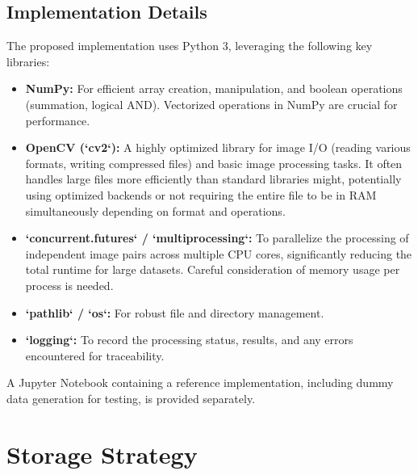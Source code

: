 \documentclass{article}
\begin{document}
\subsection{Implementation Details}
The proposed implementation uses Python 3, leveraging the following key libraries:
\begin{itemize}
    \item \textbf{NumPy:} For efficient array creation, manipulation, and boolean operations (summation, logical AND). Vectorized operations in NumPy are crucial for performance.
    \item \textbf{OpenCV (`cv2`):} A highly optimized library for image I/O (reading various formats, writing compressed files) and basic image processing tasks. It often handles large files more efficiently than standard libraries might, potentially using optimized backends or not requiring the entire file to be in RAM simultaneously depending on format and operations.
    \item \textbf{`concurrent.futures` / `multiprocessing`:} To parallelize the processing of independent image pairs across multiple CPU cores, significantly reducing the total runtime for large datasets. Careful consideration of memory usage per process is needed.
    \item \textbf{`pathlib` / `os`:} For robust file and directory management.
    \item \textbf{`logging`:} To record the processing status, results, and any errors encountered for traceability.
\end{itemize}
A Jupyter Notebook containing a reference implementation, including dummy data generation for testing, is provided separately.

\section{Storage Strategy}
\end{document}
